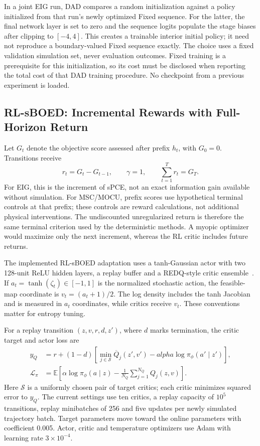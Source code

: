 \documentclass[journal]{IEEEtran}
\newcommand{\E}{\mathbb E}
\begin{document}
In a joint EIG run, DAD compares a random initialization against a policy
initialized from that run's newly optimized Fixed sequence. For the latter,
the final network layer is set to zero and the sequence logits populate the
stage biases after clipping to $[-4,4]$. This creates a trainable interior
initial policy; it need not reproduce a boundary-valued Fixed sequence exactly.
The choice uses a fixed validation simulation set, never evaluation outcomes.
Fixed training is a prerequisite for this initialization, so its cost must
be disclosed when reporting the total cost of that DAD training procedure.
No checkpoint from a previous experiment is loaded.

\subsection{RL-sBOED: Incremental Rewards with Full-Horizon Return}
Let $G_t$ denote the objective score assessed after prefix $h_t$, with $G_0=0$.
Transitions receive
\begin{equation}
r_t=G_t-G_{t-1},\qquad \gamma=1,
\qquad \sum_{t=1}^{T}r_t=G_T.
\label{eq:rl-rewards}
\end{equation}
For EIG, this is the increment of sPCE, not an exact information gain available
without simulation. For MSC/MOCU, prefix scores use hypothetical terminal
controls at that prefix; these controls are reward calculations, not additional
physical interventions. The undiscounted unregularized return is therefore
the same terminal criterion used by the deterministic methods. A myopic
optimizer would maximize only the next increment, whereas the RL critic
includes future returns.

The implemented RL-sBOED adaptation uses a tanh-Gaussian actor with two
128-unit ReLU hidden layers, a replay buffer and a REDQ-style critic
ensemble~\cite{blau2022rlsboed}. If $a_t=\tanh(\zeta_t)\in[-1,1]$ is the
normalized stochastic action, the feasible-map coordinate is $v_t=(a_t+1)/2$.
The log density includes the tanh Jacobian and is measured in $a_t$ coordinates,
while critics receive $v_t$. These conventions matter for entropy tuning.

For a replay transition $(z,v,r,d,z')$, where $d$ marks termination, the
critic target and actor loss are
\begin{align}
y_Q&=r+(1-d)\left[
 \min_{j\in\mathcal S}\overline Q_j(z',v')-alpha\log\pi_\phi(a'\mid z')\right],\\
\mathcal L_\pi&=\E\left[\alpha\log\pi_\phi(a\mid z)
 -\frac{1}{N_Q}\sum_{j=1}^{N_Q}Q_j(z,v)\right].
\label{eq:redq-objectives}
\end{align}
Here $\mathcal S$ is a uniformly chosen pair of target critics; each critic
minimizes squared error to $y_Q$. The current settings use ten critics,
a replay capacity of $10^5$ transitions, replay minibatches of 256 and five
updates per newly simulated trajectory batch. Target parameters move toward
the online parameters with coefficient 0.005. Actor, critic and temperature
optimizers use Adam with learning rate $3\times10^{-4}$.
\end{document}
